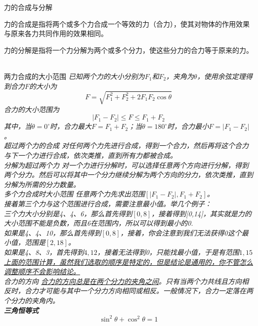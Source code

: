 \documentclass[a4paper, 12pt]{article}
\newcommand{\defitem}[2]{
\noindent \textsf{#1} \hspace{1em} \itshape{#2} \\
}
\newcommand{\formula}[2]{
  \noindent \textbf{#2} \\ \[ #1 \]
}
\begin{document}
\defitem{力的合成与分解}{
  力的合成是指将两个或多个力合成一个等效的力（合力），使其对物体的作用效果与原来各力共同作用的效果相同。

  力的分解是指将一个力分解为两个或多个分力，使这些分力的合力等于原来的力。
}

\defitem{两力合成的大小范围}{
  已知两个力的大小分别为$F_1$和$F_2$，夹角为$\theta$，使用余弦定理得到合力$F$的大小为
  \[
    F = \sqrt{F_1^2 + F_2^2 + 2F_1F_2\cos\theta}
  \]
  合力的大小范围为
  \[
    |F_1 - F_2| \leq F \leq F_1 + F_2
  \]
  其中，当$\theta=0^\circ$时，合力最大$F=F_1+F_2$；当$\theta=180^\circ$时，合力最小$F=|F_1-F_2|$。
}

\defitem{超过两个力的合成}{
  对任何两个力先进行合成，得到一个合力，然后再将这个合力与下一个力进行合成，依次类推，直到所有力都被合成。
}

\defitem{分解为超过两个力}{
  对一个力进行分解时，可以选择任意两个方向进行分解，得到两个分力。然后可以将其中一个分力继续分解为两个方向的分力，依次类推，直到分解为所需的分力数量。
}

\defitem{多个力合成时大小范围}{
  任意两个力先求出范围$[|F_1 - F_2|, F_1 + F_2]$。\\
  接着第三个力与这个范围进行合成，需要注意最小值。举几个例子：\\
  三个力大小分别是4、4、6，那么首先得到$[0,8]$，接着得到[0,14]，其实就是力的大小范围不能是负数，而且6在范围内，所以可以得到最小的0.\\
  如果是4、4、10，那么首先得到$[0,8]$，接着，你会注意到我们无法获得0这个最小值，范围是$[2,18]$。\\
  如果是4、8、3，首先得到$4,12$，接着无法得到0，只能找最小值，于是有范围$1,15$\\
  \underline{上面的范围计算，虽然我们选取的顺序是特定的，但是结论是通用的，你不管怎么调整顺序不会影响结论。}
}

\defitem{合力的方向}{
  \underline{合力的方向总是在两个分力的夹角之间}。只有当两个力共线且方向相反时，合力才可能与其中一个分力方向相同或相反。一般情况下，合力一定落在两个分力的夹角内。
}

\formula{\sin^2\theta + \cos^2\theta = 1}{三角恒等式}
\end{document}
